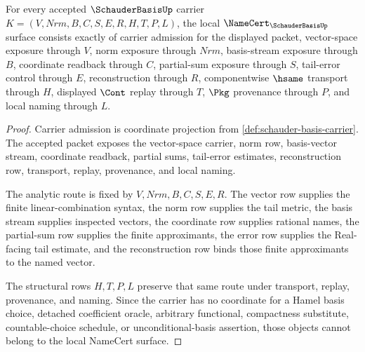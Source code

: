 \begin{theorem}
\label{thm:schauder-basis-namecert-obligations}
For every accepted $\SchauderBasisUp$ carrier $K=(V,Nrm,B,C,S,E,R,H,T,P,L)$, the local $\NameCert_{\SchauderBasisUp}$ surface consists exactly of carrier admission for the displayed packet, vector-space exposure through $V$, norm exposure through $Nrm$, basis-stream exposure through $B$, coordinate readback through $C$, partial-sum exposure through $S$, tail-error control through $E$, reconstruction through $R$, componentwise $\hsame$ transport through $H$, displayed $\Cont$ replay through $T$, $\Pkg$ provenance through $P$, and local naming through $L$.
\end{theorem}
\begin{proof}
Carrier admission is coordinate projection from \autoref{def:schauder-basis-carrier}. The accepted packet exposes the vector-space carrier, norm row, basis-vector stream, coordinate readback, partial sums, tail-error estimates, reconstruction row, transport, replay, provenance, and local naming.

The analytic route is fixed by $V,Nrm,B,C,S,E,R$. The vector row supplies the finite linear-combination syntax, the norm row supplies the tail metric, the basis stream supplies inspected vectors, the coordinate row supplies rational names, the partial-sum row supplies the finite approximants, the error row supplies the Real-facing tail estimate, and the reconstruction row binds those finite approximants to the named vector.

The structural rows $H,T,P,L$ preserve that same route under transport, replay, provenance, and naming. Since the carrier has no coordinate for a Hamel basis choice, detached coefficient oracle, arbitrary functional, compactness substitute, countable-choice schedule, or unconditional-basis assertion, those objects cannot belong to the local NameCert surface.
\end{proof}


